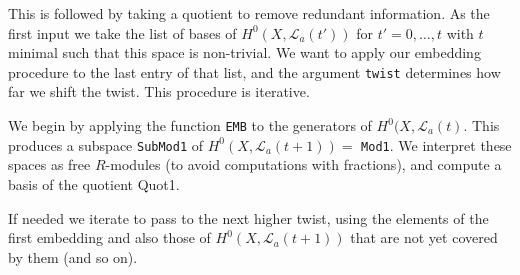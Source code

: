\documentclass[a4paper,10pt]{amsart}
\theoremstyle{definition}
\theoremstyle{plain}
\newcommand{\cL}{{\mathcal L}}
\begin{document}
This is followed by taking a quotient to remove redundant information. As the first input we take the list of bases of $H^0(X, \cL_a(t'))$ for $t' = 0, \dots, t$ with $t$ minimal such that this space is non-trivial. We want to apply our embedding procedure to the last entry of that list, and the argument \texttt{twist} determines how far we shift the twist. This procedure is iterative.

We begin by applying the function \texttt{EMB} to the generators of $H^0(X, \cL_a(t)$. This produces a subspace \texttt{SubMod1} of $H^0(X, \cL_a(t+1)) =$ \texttt{Mod1}. We interpret these spaces as free $R$-modules (to avoid computations with fractions), and compute a basis of the quotient Quot1.

If needed we iterate to pass to the next higher twist, using the elements of the first embedding and also those of $H^0(X, \cL_a(t+1))$ that are not yet covered by them (and so on).
\end{document}

